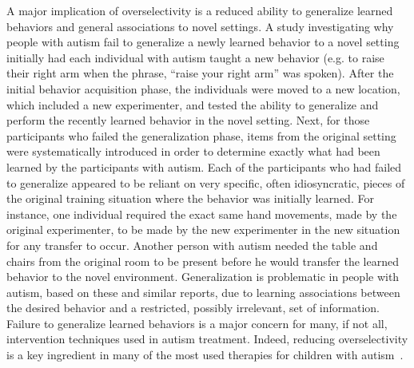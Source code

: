 \documentclass[man]{apa}
\begin{document}
A major implication of overselectivity is a reduced ability to generalize learned behaviors and general associations to novel settings.  A study investigating why people with autism fail to generalize a newly learned behavior to a novel setting initially had each individual with autism taught a new behavior (e.g. to raise their right arm when the phrase, ``raise your right arm'' was spoken).  After the initial behavior acquisition phase, the individuals were moved to a new location, which included a new experimenter, and tested the ability to generalize and perform the recently learned behavior in the novel setting.  Next, for those participants who failed the generalization phase, items from the original setting were systematically introduced in order to determine exactly what had been learned by the participants with autism.  Each of the participants who had failed to generalize appeared to be reliant on very specific, often idiosyncratic, pieces of the original training situation where the behavior was initially learned.  For instance, one individual required the exact same hand movements, made by the original experimenter, to be made by the new experimenter in the new situation for any transfer to occur.  Another person with autism needed the table and chairs from the original room to be present before he would transfer the learned behavior to the novel environment.  Generalization is problematic in people with autism, based on these and similar reports, due to learning associations between the desired behavior and a restricted, possibly irrelevant, set of information. Failure to generalize learned behaviors is a major concern for many, if not all, intervention techniques used in autism treatment.  Indeed, reducing overselectivity is a key ingredient in many of the most used therapies for children with autism~\cite{RefWorks:130,RefWorks:132}.


\end{document}
